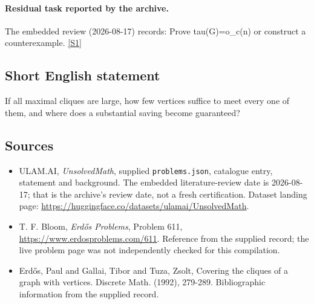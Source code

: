 \documentclass[11pt,a4paper]{article}
\newcommand{\sref}[2]{\hyperlink{source:#1:#2}{[S#2]}}
\begin{document}
\paragraph{Residual task reported by the archive.}

The embedded review (2026-08-17) records: Prove tau(G)=o\_c(n) or construct a counterexample. \sref{statement}{1}

\subsection{Short English statement}

If all maximal cliques are large, how few vertices suffice to meet every one of them, and where does a substantial saving become guaranteed?

\subsection{Sources}

{\small

\begin{itemize}

\item[\hypertarget{source:statement:1}{S1}] ULAM.AI, \emph{UnsolvedMath}, supplied \texttt{problems.json}, catalogue entry, statement and background. The embedded literature-review date is 2026-08-17; that is the archive’s review date, not a fresh certification. Dataset landing page: \url{https://huggingface.co/datasets/ulamai/UnsolvedMath}.

\item[\hypertarget{source:statement:2}{S2}] T. F. Bloom, \emph{Erdős Problems}, Problem 611, \url{https://www.erdosproblems.com/611}. Reference from the supplied record; the live problem page was not independently checked for this compilation.

\item[\hypertarget{source:statement:3}{S3}] Erd\H{o}s, Paul and Gallai, Tibor and Tuza, Zsolt, Covering the cliques of a graph with vertices. Discrete Math. (1992), 279-289. Bibliographic information from the supplied record.

\end{itemize}

}

\label{end:statement}
\end{document}
